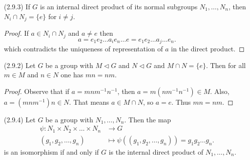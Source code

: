 
\begin{lemma}
	(2.9.3) If $G$ is an internal direct product of its normal subgroups $N_1, \ldots, N_n$, then $N_i \cap N_j = \{e\} $ for $i \neq j$.
\end{lemma}
\begin{proof}
	If $a \in N_i \cap N_j$ and $a \neq  e$ then
	\[
		a = e_1e_2\ldots a_i e_n\ldots e 
		= e_1 e_2 \ldots a_j \ldots e_n
	.\] 
	which contradicts the uniqueness of representation of $a$ in the direct product.
\end{proof}

\begin{lemma}
	(2.9.2)
	Let $G$ be a group with $M \triangleleft G$ and $N \triangleleft G$ and $M \cap  N  =\{e\} $. Then for all $m \in  M$ and $n \in N$ one has $mn = nm$.

\end{lemma}
\begin{proof}
	Observe that if $a = m n m^{-1} n^{-1} $, then $a = m(n m^{-1} n^{-1} ) \in M$. Also, $a = (m n m^{-1} ) n \in N$. That means $a \in M \cap N$, so $a = e$. Thus $mn = nm$.
\end{proof}
\begin{theorem}
	(2.9.4)
	Let $G$ be a group with $N_1,\ldots,N_n$. Then the map
	\begin{align*}
		\psi: N_1\times N_2\times \ldots\times N_n &\longrightarrow G \\
		(g_1,g_2,\ldots,g_n) &\longmapsto \psi((g_1,g_2,\ldots,g_n)) = g_1g_2\ldots g_n
	.\end{align*}
	is an isomorphism if and only if $G$ is the internal direct product of $N_1, \ldots, N_n$.
\end{theorem}
